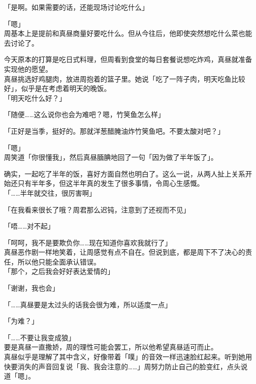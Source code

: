 「是啊。如果需要的话，还能现场讨论吃什么」

「嗯」\\

周基本上是提前和真昼商量好要吃什么。但从今往后，他即使突然想吃什么菜也能去讨论了。

今天原本的打算是吃日式料理，但周看到食堂的每日套餐说想吃炸鸡，真昼就准备实现他的愿望。\\

真昼挑选好鸡腿肉，放进周抱着的篮子里。她说「吃了一阵子肉，明天吃鱼比较好」，似乎是在考虑着明天的晚饭。\\

「明天吃什么好？」

「随便……这么说你也会为难吧？嗯，竹䇲鱼怎么样」

「正好是当季，挺好的。那就洋葱醋腌油炸竹䇲鱼吧。不要太酸对吧？」

「嗯」\\

周笑道「你很懂我」，然后真昼腼腆地回了一句「因为做了半年饭了」。

确实，一起吃了半年的饭，喜好方面自然也明白了。这么一说，从两人扯上关系开始还只有半年多，但这半年真的发生了很多事情，令周心生感慨。\\

「……半年就交往，很厉害啊」

「在我看来很长了哦？周君那么迟钝，注意到了还视而不见」

「唔……对不起」

「呵呵，我不是要欺负你……现在知道你喜欢我就行了」\\

真昼恶作剧一样地笑着，让周感觉有点不自在。但说到底，都是周下不了决心的责任，所以他只能全面承认错误。\\

「那个，之后我会好好表达爱情的」

「谢谢，我也会」

「……真昼要是太过头的话我会很为难，所以适度一点」

「为难？」

「……不要让我变成狼」\\

要是真昼一直撒娇，周的理性可能会罢工，所以他希望真昼适可而止。\\

真昼似乎是理解了其中含义，好像带着「噗」的音效一样迅速脸红起来。听到她用快要消失的声音回复说「我、我会注意的……」周努力防止自己的脸变红，点头说道「嗯」。
